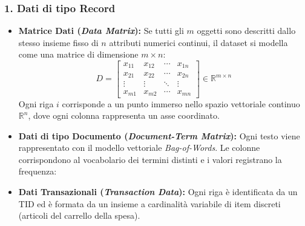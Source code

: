 \subsubsection{1. Dati di tipo Record}
\begin{itemize}
    \item \textbf{Matrice Dati (\textit{Data Matrix}):} Se tutti gli $m$ oggetti sono descritti dallo stesso insieme fisso di $n$ attributi numerici continui, il dataset si modella come una matrice di dimensione $m \times n$:
    \begin{equation}
        D = \begin{bmatrix}
        x_{11} & x_{12} & \cdots & x_{1n} \\
        x_{21} & x_{22} & \cdots & x_{2n} \\
        \vdots & \vdots & \ddots & \vdots \\
        x_{m1} & x_{m2} & \cdots & x_{mn}
        \end{bmatrix} \in \mathbb{R}^{m \times n}
    \end{equation}
    Ogni riga $i$ corrisponde a un punto immerso nello spazio vettoriale continuo $\mathbb{R}^n$, dove ogni colonna rappresenta un asse coordinato.
    \item \textbf{Dati di tipo Documento (\textit{Document-Term Matrix}):} Ogni testo viene rappresentato con il modello vettoriale \textit{Bag-of-Words}. Le colonne corrispondono al vocabolario dei termini distinti e i valori registrano la frequenza:
    \begin{table}[H]
    \centering
    \caption{Rappresentazione Document-Term Matrix per testi non strutturati.}
    \label{tab:doc-term-matrix}
    \end{table}
    \item \textbf{Dati Transazionali (\textit{Transaction Data}):} Ogni riga \`e identificata da un TID ed \`e formata da un insieme a cardinalit\`a variabile di item discreti (articoli del carrello della spesa).
\end{itemize}

